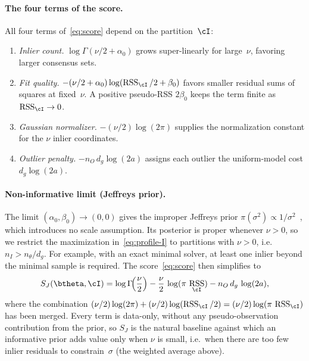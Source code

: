 \documentclass{article}
\DeclareMathOperator{\RSS}{RSS}
\begin{document}
\paragraph{The four terms of the score.}
All four terms of~\eqref{eq:score} depend on the partition~$\cI$:
\begin{enumerate}
	\item \emph{Inlier count.} $\log\Gamma(\nu/2 + \alpha_0)$ grows
	      super-linearly for large~$\nu$, favoring larger consensus sets.
	\item \emph{Fit quality.}
	      $-(\nu/2 + \alpha_0)\log(\RSS_\cI/2 + \beta_0)$ favors smaller
	      residual sums of squares at fixed~$\nu$.  A positive pseudo-RSS
	      $2\beta_0$ keeps the term finite as $\RSS_\cI \to 0$.
	\item \emph{Gaussian normalizer.} $-(\nu/2)\log(2\pi)$ supplies the
	      normalization constant for the $\nu$ inlier coordinates.
	\item \emph{Outlier penalty.} $-n_O\,d_g\log(2a)$ assigns each outlier
	      the uniform-model cost $d_g\log(2a)$.
\end{enumerate}

\paragraph{Non-informative limit (Jeffreys prior).}
The limit $(\alpha_0, \beta_0) \to (0,0)$ gives the improper Jeffreys
prior $\pi(\sigma^2) \propto 1/\sigma^2$~\cite{Jeffreys1946}, which
introduces no scale assumption. Its posterior is proper whenever $\nu
	> 0$, so we restrict the maximization in~\eqref{eq:profile-I} to
partitions with $\nu > 0$, i.e.\ $n_I > n_\theta/d_g$. For example,
with an exact minimal solver, at least one inlier beyond the minimal
sample is required. The score~\eqref{eq:score} then simplifies to
\begin{equation}
	S_J(\btheta, \cI) = \log\Gamma\!\Bigl(\frac{\nu}{2}\Bigr) -
	\frac{\nu}{2}\,\log(\pi\,\RSS_\cI) - n_O\, d_g\,\log(2a),
	\label{eq:score-jeffreys}
\end{equation}
where the combination $(\nu/2)\log(2\pi) + (\nu/2)\log(\RSS_\cI/2) =
	(\nu/2)\log(\pi\,\RSS_\cI)$ has been merged.  Every term is data-only,
without any pseudo-observation contribution from the prior, so $S_J$
is the natural baseline against which an informative prior adds value
only when $\nu$ is small, i.e.\ when there are too few inlier
residuals to constrain~$\sigma$ (the weighted average above).
\end{document}
